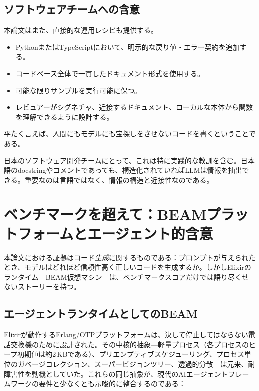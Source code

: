 \documentclass[11pt]{article}
\newcommand{\elixir}{Elixir}
\begin{document}
\subsection{ソフトウェアチームへの含意}

本論文はまた、直接的な運用レシピも提供する。

\begin{itemize}
  \item PythonまたはTypeScriptにおいて、明示的な戻り値・エラー契約を追加する。
  \item コードベース全体で一貫したドキュメント形式を使用する。
  \item 可能な限りサンプルを実行可能に保つ。
  \item レビュアーがシグネチャ、近接するドキュメント、ローカルな本体から関数を理解できるように設計する。
\end{itemize}

平たく言えば、人間にもモデルにも宝探しをさせないコードを書くということである。

日本のソフトウェア開発チームにとって、これは特に実践的な教訓を含む。日本語のdocstringやコメントであっても、構造化されていればLLMは情報を抽出できる。重要なのは言語ではなく、情報の構造と近接性なのである。

\section{ベンチマークを超えて：BEAMプラットフォームとエージェント的含意}
\label{sec:beam}

本論文における証拠はコード\emph{生成}に関するものである：プロンプトが与えられたとき、モデルはどれほど信頼性高く正しいコードを生成するか。しかし\elixir{}のランタイム---BEAM仮想マシン---は、ベンチマークスコアだけでは語り尽くせないストーリーを持つ。

\subsection{エージェントランタイムとしてのBEAM}

\elixir{}が動作するErlang/OTPプラットフォームは、決して停止してはならない電話交換機のために設計された。その中核的抽象---軽量プロセス（各プロセスのヒープ初期値は約2\,KBである）、プリエンプティブスケジューリング、プロセス単位のガベージコレクション、スーパービジョンツリー、透過的分散---は元来、耐障害性を動機としていた\cite{nvlang}。これらの同じ抽象が、現代のAIエージェントフレームワークの要件と少なくとも示唆的に整合するのである：
\end{document}

